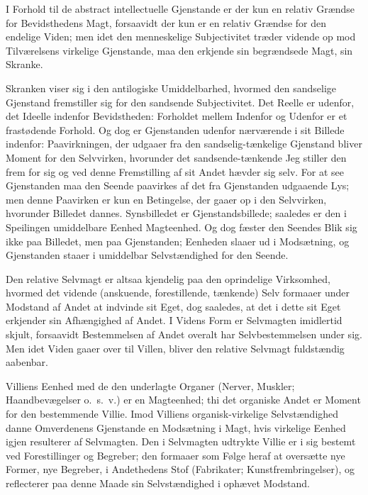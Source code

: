 \documentclass[12pt]{book}
\newcommand{\opage}[1]{\marginnote{\footnotesize\textit{[#1]}}}
\begin{document}
I Forhold til de abstract intellectuelle Gjenstande er
der kun en relativ Grændse for Bevidsthedens Magt, forsaavidt
\opage{32} der kun er en relativ Grændse for den endelige
Viden; men idet den menneskelige Subjectivitet træder
vidende op mod Tilværelsens virkelige Gjenstande, maa den
erkjende sin begrændsede Magt, sin Skranke.

Skranken viser sig i den antilogiske Umiddelbarhed,
hvormed den sandselige Gjenstand fremstiller sig for den
sandsende Subjectivitet. Det Reelle er udenfor, det Ideelle
indenfor Bevidstheden: Forholdet mellem Indenfor og
Udenfor er et frastødende Forhold. Og dog er Gjenstanden
udenfor nærværende i sit Billede indenfor: Paavirkningen,
der udgaaer fra den sandselig-tænkelige Gjenstand bliver
Moment for den Selvvirken, hvorunder det sandsende-tænkende
Jeg stiller den frem for sig og ved denne Fremstilling af sit
Andet hævder sig selv. For at see Gjenstanden maa den
Seende paavirkes af det fra Gjenstanden udgaaende Lys;
men denne Paavirken er kun en Betingelse, der gaaer op i
den Selvvirken, hvorunder Billedet dannes. Synsbilledet
er Gjenstandsbillede; saaledes er den i Speilingen
umiddelbare Eenhed Magteenhed. Og dog fæster den Seendes Blik
sig ikke paa Billedet, men paa Gjenstanden; Eenheden slaaer
ud i Modsætning, og Gjenstanden staaer i umiddelbar
Selvstændighed for den Seende.

Den relative Selvmagt er altsaa kjendelig paa den
oprindelige Virksomhed, hvormed det vidende (anskuende,
forestillende, tænkende) Selv formaaer under Modstand af Andet
at indvinde sit Eget, dog saaledes, at det i dette sit Eget
erkjender sin Afhængighed af Andet. I Videns Form er
Selvmagten imidlertid skjult, forsaavidt Bestemmelsen af Andet
overalt har Selvbestemmelsen under sig. Men idet Viden
gaaer over til Villen, bliver den relative Selvmagt
fuldstændig aabenbar.

Villiens Eenhed med de den underlagte Organer (Nerver,
Muskler; Haandbevægelser o.~s.~v.) er en Magteenhed;
thi det organiske Andet er Moment for den bestemmende
\opage{33} Villie. Imod Villiens organisk-virkelige Selvstændighed
danne Omverdenens Gjenstande en Modsætning i Magt, hvis
virkelige Eenhed igjen resulterer af Selvmagten. Den i
Selvmagten udtrykte Villie er i sig bestemt ved Forestillinger og
Begreber; den formaaer som Følge heraf at oversætte nye
Former, nye Begreber, i Andethedens Stof (Fabrikater;
Kunstfrembringelser), og reflecterer paa denne Maade sin
Selvstændighed i ophævet Modstand.
\end{document}
